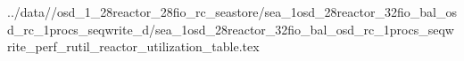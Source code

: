 ../data//osd_1_28reactor_28fio_rc_seastore/sea_1osd_28reactor_32fio_bal_osd_rc_1procs_seqwrite_d/sea_1osd_28reactor_32fio_bal_osd_rc_1procs_seqwrite_perf_rutil_reactor_utilization_table.tex